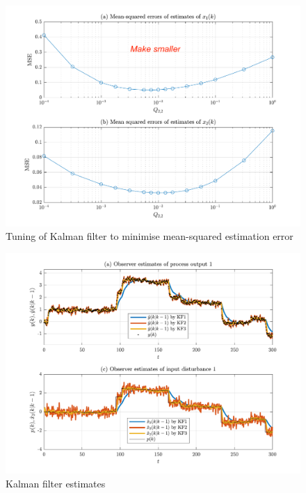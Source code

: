 \begin{figure}[htp]
	\centering
	\includegraphics[width=15cm]{images/rod-obs-tuning-KF2-plot-DRAFT.pdf}
	\caption{Tuning of Kalman filter to minimise mean-squared estimation error}
	\label{fig:rod-obs-tuning-KF2-plot}
\end{figure}


\begin{figure}[htp]
	\centering
	\includegraphics[width=15cm]{images/rod-obs-sim-1-4-est-KF.pdf}
	\caption{Kalman filter estimates}
	\label{fig:rod-obs-sim-1-4-est-KF}
\end{figure}

